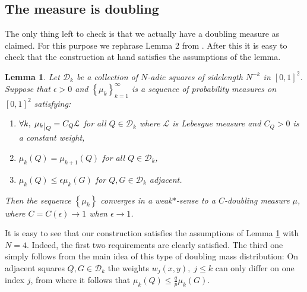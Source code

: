 \documentclass[reqno,12pt]{amsart}
\theoremstyle{plain}
\newtheorem{lemma}[theorem]{Lemma}
\theoremstyle{remark}
\begin{document}
\subsection{The measure is doubling}
The only thing left to check is that we actually have a doubling measure as claimed.
For this purpose we rephrase Lemma 2 from \cite{PengWen2014}. 
After this it is easy to check that the construction at hand satisfies the assumptions of the lemma.
\begin{lemma}\cite[Lemma 2]{PengWen2014}
  Let ${\ensuremath{\mathcal{D}}}_k$ be a collection of $N$-adic squares of sidelength $N^{-k}$ in $[0,1]^2$. Suppose that $\epsilon>0$ and
  $\left\{ \mu_k \right\}_{k=1}^{\infty}$ is a sequence of probability measures on $[0,1]^2$ satisfying:
  \begin{enumerate}
    \item $\forall k, \; \mu_k {\lower3pt\hbox{$|_{{Q}}$}} = C_{Q} {\ensuremath{\mathcal{L}}}$ for all $Q \in {\ensuremath{\mathcal{D}}}_k$ where ${\ensuremath{\mathcal{L}}}$ is Lebesgue measure and
      $C_{Q}>0$ is a constant weight,
    \item $\mu_k(Q) = \mu_{k+1}(Q)$ for all $Q \in {\ensuremath{\mathcal{D}}}_k$,
    \item $\mu_k(Q) \leq \epsilon \mu_k(G)$ for $Q, G \in {\ensuremath{\mathcal{D}}}_k$ adjacent.
  \end{enumerate}
  Then the sequence $\left\{ \mu_k  \right\}$ converges in a weak$*$-sense 
  to a $C$-doubling measure $\mu$, where $C=C(\epsilon) \to 1$ when $\epsilon \to 1$. 
  \label{le:doubling_limit}
\end{lemma}

It is easy to see that our construction satisfies the assumptions of Lemma \ref{le:doubling_limit} with $N=4$. 
Indeed, the first two requirements are clearly satisfied. The third one simply follows from the 
main idea of this type of doubling mass distribution: On adjacent 
squares $Q, G \in {\ensuremath{\mathcal{D}}}_k$ the weights $w_j(x,y), \; j\leq k$ can only differ on one index $j$, from where it follows that 
$\mu_k(Q) \leq \frac{q}{p} \mu_k(G)$.



\end{document}
